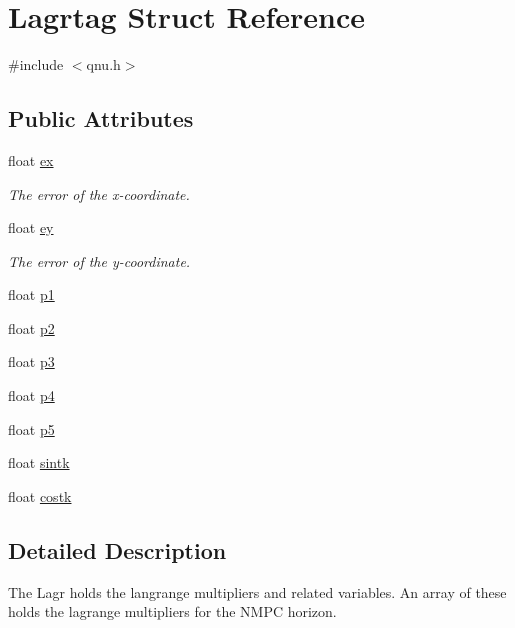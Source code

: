 \hypertarget{struct_lagrtag}{\section{Lagrtag Struct Reference}
\label{struct_lagrtag}
}


{\ttfamily \#include $<$qnu.\-h$>$}

\subsection*{Public Attributes}
\begin{DoxyCompactItemize}
\item 
float \hyperlink{struct_lagrtag_a484c424884aba9f6449f4f6820c24376}{ex}
\begin{DoxyCompactList}\small\item\em The error of the x-\/coordinate. \end{DoxyCompactList}\item 
float \hyperlink{struct_lagrtag_a5d794c31a0f46fc41ba38399549d29aa}{ey}
\begin{DoxyCompactList}\small\item\em The error of the y-\/coordinate. \end{DoxyCompactList}\item 
float \hyperlink{struct_lagrtag_a389791d847985147ab3053236ef0fa8d}{p1}
\item 
float \hyperlink{struct_lagrtag_a15a267dd9d5863cb89e3c77b8e7d9ea9}{p2}
\item 
float \hyperlink{struct_lagrtag_ae25d9be769b1e7502c173c57702d9996}{p3}
\item 
float \hyperlink{struct_lagrtag_a7c9cd37533fca3d93d9e26c21bd18e75}{p4}
\item 
float \hyperlink{struct_lagrtag_aa53127488b4e72a3328a66d6da022f79}{p5}
\item 
float \hyperlink{struct_lagrtag_ae806547ee3be937865c70095c33fa01f}{sintk}
\item 
float \hyperlink{struct_lagrtag_ac8d1c29a3fb78cfcced735edca0b19f6}{costk}
\end{DoxyCompactItemize}


\subsection{Detailed Description}
The Lagr holds the langrange multipliers and related variables. An array of these holds the lagrange multipliers for the N\-M\-P\-C horizon. 

